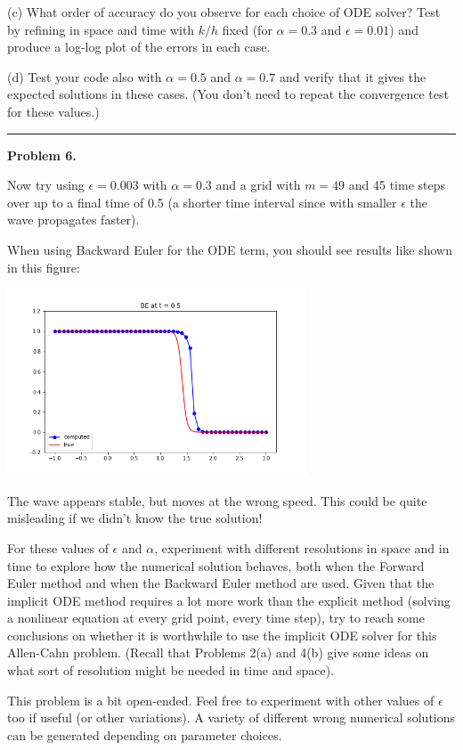 \documentclass[10pt]{article}
\begin{document}
(c) What order of accuracy do you observe for each choice of ODE solver?
Test by refining in space and time with $k/h$ fixed (for $\alpha=0.3$ and
$\epsilon = 0.01$) and produce a log-log plot of the errors in each case.

(d) Test your code also with $\alpha = 0.5$ and $\alpha = 0.7$ and verify
that it gives the expected solutions in these cases.  (You don't need to
repeat the convergence test for these values.)



\vskip 10pt
\hrule
\vskip 10pt
{\large\bf Problem 6.} \vskip 5pt

Now try using $\epsilon = 0.003$ with $\alpha=0.3$ 
and a grid with $m=49$ and 45 time steps over up to a final time of 0.5 
(a shorter time interval since with smaller $\epsilon$ the wave 
propagates faster).

When using Backward Euler for the ODE term, you should see results like shown 
in this figure:

\hfil\includegraphics[width=3.5in]{figs/ACwithBE.png}\hfil

The wave appears stable, but moves at the wrong speed. This could be quite
misleading if we didn't know the true solution! 

For these values of $\epsilon$ and $\alpha$, experiment with different 
resolutions in space and in time to explore how the numerical solution behaves,
both when the Forward Euler method and when the Backward Euler method 
are used.  Given that the implicit ODE method requires a lot more work than the
explicit method (solving a nonlinear equation at every grid point, every time
step), try to reach some conclusions on whether it is worthwhile to use
the implicit ODE solver for this Allen-Cahn problem.  (Recall that Problems
2(a) and 4(b) give some ideas on what sort of resolution might be needed
in time and space).

This problem is a bit open-ended.  Feel free to experiment with other values
of $\epsilon$ too if useful (or other variations). A variety of different
wrong numerical solutions can be generated depending on parameter choices.
\end{document}
